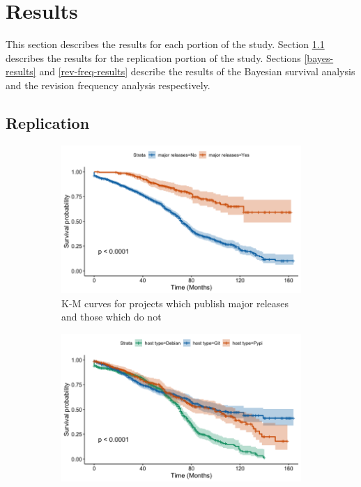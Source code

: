 \documentclass[sigconf]{acmart}
\begin{document}
\section{Results} \label{results}

This section describes the results for each portion of the study. 
Section \ref{repl-results} describes the results for the replication portion of the study. 
Sections \ref{bayes-results} and \ref{rev-freq-results} describe the results of the Bayesian survival analysis and the revision frequency analysis respectively.

\subsection{Replication} \label{repl-results}

\begin{figure}
    \centering
    \begin{subfigure}[b]{\columnwidth}
        \centering
        \includegraphics[width=\textwidth]{img/KM-major_release.jpg}
        \caption{\small K-M curves for projects which publish major releases and those which do not} 
        \label{fig:major_releases}
    \end{subfigure}
    \hfill
    \begin{subfigure}[b]{\columnwidth}
        \centering 
        \includegraphics[width=\textwidth]{img/KM-host_type.jpg}

\end{subfigure}
\end{figure}
\end{document}
